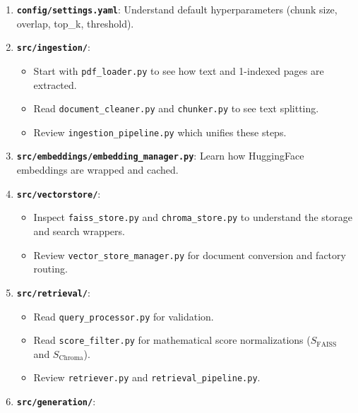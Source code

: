 \documentclass[
]{article}
\providecommand{\tightlist}{%
  \setlength{\itemsep}{0pt}\setlength{\parskip}{0pt}}
\begin{document}
\begin{enumerate}
\def\labelenumi{\arabic{enumi}.}
\tightlist
\item
  \textbf{\texttt{config/\allowbreak settings.\allowbreak yaml}}: Understand default
  hyperparameters (chunk size, overlap, top\_k, threshold).
\item
  \textbf{\texttt{src/\allowbreak ingestion/\allowbreak }}:

  \begin{itemize}
  \tightlist
  \item
    Start with \texttt{pdf\_\allowbreak loader.\allowbreak py} to see how text and 1-indexed
    pages are extracted.
  \item
    Read \texttt{document\_\allowbreak cleaner.\allowbreak py} and \texttt{chunker.\allowbreak py} to see
    text splitting.
  \item
    Review \texttt{ingestion\_\allowbreak pipeline.\allowbreak py} which unifies these steps.
  \end{itemize}
\item
  \textbf{\texttt{src/\allowbreak embeddings/\allowbreak embedding\_\allowbreak manager.\allowbreak py}}: Learn how
  HuggingFace embeddings are wrapped and cached.
\item
  \textbf{\texttt{src/\allowbreak vectorstore/\allowbreak }}:

  \begin{itemize}
  \tightlist
  \item
    Inspect \texttt{faiss\_\allowbreak store.\allowbreak py} and \texttt{chroma\_\allowbreak store.\allowbreak py} to
    understand the storage and search wrappers.
  \item
    Review \texttt{vector\_\allowbreak store\_\allowbreak manager.\allowbreak py} for document conversion
    and factory routing.
  \end{itemize}
\item
  \textbf{\texttt{src/\allowbreak retrieval/\allowbreak }}:

  \begin{itemize}
  \tightlist
  \item
    Read \texttt{query\_\allowbreak processor.\allowbreak py} for validation.
  \item
    Read \texttt{score\_\allowbreak filter.\allowbreak py} for mathematical score normalizations
    (\(S_{\text{FAISS}}\) and \(S_{\text{Chroma}}\)).
  \item
    Review \texttt{retriever.\allowbreak py} and \texttt{retrieval\_\allowbreak pipeline.\allowbreak py}.
  \end{itemize}
\item
  \textbf{\texttt{src/\allowbreak generation/\allowbreak }}:


\end{enumerate}
\end{document}
